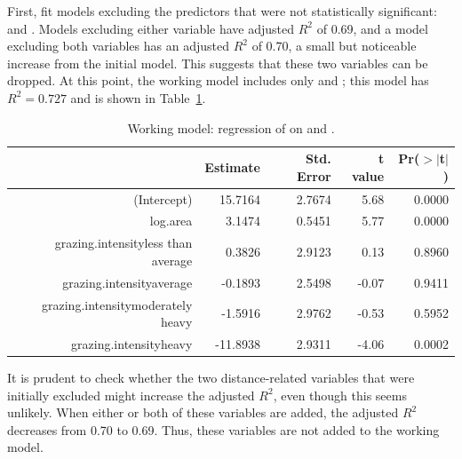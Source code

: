 First, fit models excluding the predictors that were not statistically significant:  and . Models excluding either variable have adjusted $R^2$ of 0.69, and a model excluding both variables has an adjusted $R^2$ of 0.70, a small but noticeable increase from the initial model. This suggests that these two variables can be dropped. At this point, the working model includes only  and ; this model has $R^2 = 0.727$ and is shown in Table~\ref{forestbirdsAbunLogAreaGrazingRegress}. 

\begin{table}[h]
	\centering
	\begin{tabular}{rrrrr}
		\hline
		& Estimate & Std. Error & t value & Pr($>$$|$t$|$) \\ 
		\hline
		(Intercept) & 15.7164 & 2.7674 & 5.68 & 0.0000 \\ 
		log.area & 3.1474 & 0.5451 & 5.77 & 0.0000 \\ 
		grazing.intensityless than average & 0.3826 & 2.9123 & 0.13 & 0.8960 \\ 
		grazing.intensityaverage & -0.1893 & 2.5498 & -0.07 & 0.9411 \\ 
		grazing.intensitymoderately heavy & -1.5916 & 2.9762 & -0.53 & 0.5952 \\ 
		grazing.intensityheavy & -11.8938 & 2.9311 & -4.06 & 0.0002 \\ 
		\hline
	\end{tabular}
	\caption{Working model: regression of  on  and .}
	\label{forestbirdsAbunLogAreaGrazingRegress}
\end{table}

It is prudent to check whether the two distance-related variables that were initially excluded might increase the adjusted $R^2$, even though this seems unlikely. When either or both of these variables are added, the adjusted $R^2$ decreases from 0.70 to 0.69. Thus, these variables are not added to the working model. 


\begin{comment}
This model shows two features that sometimes arise in multiple regression.  The statistical significance of a variable or category may change when other variables are added to a model. That happened initially with \var{altitude}, which was significant as a single predictor, and has happened in this working model with the grazing intensity categories "less than average", "average", and "moderately heavy." 
\end{comment}

